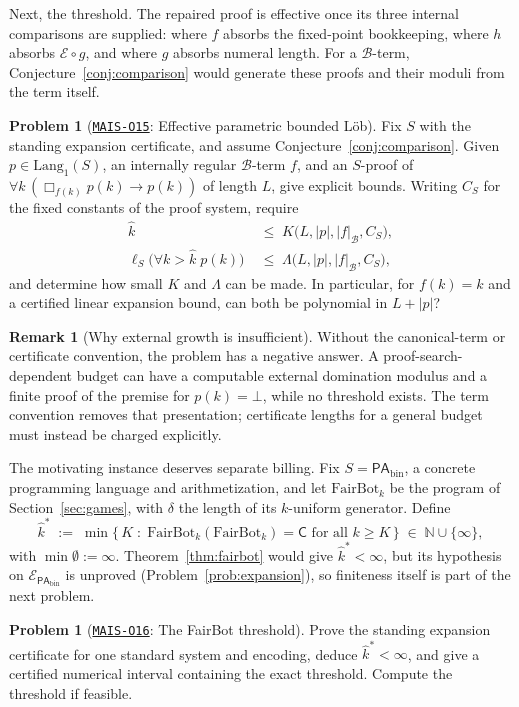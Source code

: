 \documentclass[11pt]{amsart}
\newcommand{\Oid}[1]{\href{https://github.com/lionellevine/MAIS/blob/main/open-problems/MAIS-O#1.md}{\texttt{MAIS-O#1}}}
\theoremstyle{plain}
\theoremstyle{definition}
\newtheorem{problem}[theorem]{Problem}
\newtheorem{remark}[theorem]{Remark}
\newcommand{\PAbin}{\mathsf{PA}_{\mathrm{bin}}}
\newcommand{\Lang}{\mathrm{Lang}}
\newcommand{\FB}{\mathrm{FairBot}}
\newcommand{\Bud}{\mathcal{B}}
\begin{document}
Next, the threshold. The repaired proof is effective once its three internal comparisons are supplied: where $f$ absorbs the fixed-point bookkeeping, where $h$ absorbs $\mathcal E\circ g$, and where $g$ absorbs numeral length. For a $\Bud$-term, Conjecture~\ref{conj:comparison} would generate these proofs and their moduli from the term itself.

\begin{problem}[\Oid{15}: Effective parametric bounded L\"ob]
\label{prob:effective}
Fix $S$ with the standing expansion certificate, and assume Conjecture~\ref{conj:comparison}. Given $p\in\Lang_1(S)$, an internally regular $\Bud$-term $f$, and an $S$-proof of $\forall k\,(\Box_{f(k)}p(k)\to p(k))$ of length $L$, give explicit bounds. Writing $C_S$ for the fixed constants of the proof system, require
\[
\begin{aligned}
\hat{k}
  &\;\le\; K\bigl(L,|p|,|f|_{\Bud},C_S\bigr),\\
\ell_S\bigl(\forall k>\hat{k}\;p(k)\bigr)
  &\;\le\; \Lambda\bigl(L,|p|,|f|_{\Bud},C_S\bigr),
\end{aligned}
\]
and determine how small $K$ and $\Lambda$ can be made. In particular, for $f(k)=k$ and a certified linear expansion bound, can both be polynomial in $L+|p|$?
\end{problem}

\begin{remark}[Why external growth is insufficient]
Without the canonical-term or certificate convention, the problem has a negative answer. A proof-search-dependent budget can have a computable external domination modulus and a finite proof of the premise for $p(k)=\bot$, while no threshold exists. The term convention removes that presentation; certificate lengths for a general budget must instead be charged explicitly.
\end{remark}

The motivating instance deserves separate billing. Fix $S=\PAbin$, a concrete programming language and arithmetization, and let $\FB_k$ be the program of Section~\ref{sec:games}, with $\delta$ the length of its $k$-uniform generator. Define
\[
\hat{k}^{*} \;:=\; \min\{\, K \;:\; \FB_k(\FB_k) = \mathsf{C} \text{ for all } k \ge K \,\} \;\in\; \mathbb{N} \cup \{\infty\},
\]
with $\min\emptyset := \infty$. Theorem~\ref{thm:fairbot} would give $\hat{k}^{*} < \infty$, but its hypothesis on $\mathcal{E}_{\PAbin}$ is unproved (Problem~\ref{prob:expansion}), so finiteness itself is part of the next problem.

\begin{problem}[\Oid{16}: The FairBot threshold]
\label{prob:fairbot}
Prove the standing expansion certificate for one standard system and encoding, deduce $\hat{k}^{*}<\infty$, and give a certified numerical interval containing the exact threshold. Compute the threshold if feasible.
\end{problem}
\end{document}
